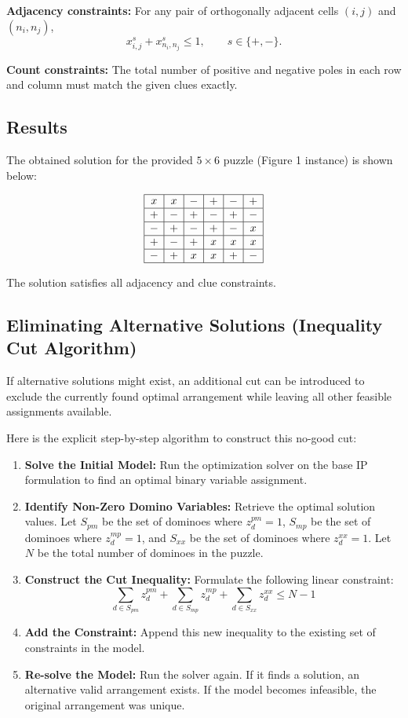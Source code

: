 \documentclass[11pt,a4paper]{article}
\begin{document}
\textbf{Adjacency constraints:} For any pair of orthogonally adjacent cells $(i,j)$ and $(n_i,n_j)$,
\[
x_{i,j}^{s}+x_{n_i,n_j}^{s} \leq 1, \qquad s \in \{+,-\}.
\]

\textbf{Count constraints:} The total number of positive and negative poles in each row and column must match the given clues exactly.

\subsection*{Results}

The obtained solution for the provided $5\times 6$ puzzle (Figure 1 instance) is shown below:

\[
\begin{array}{|c|c|c|c|c|c|}
\hline
x & x & - & + & - & + \\
\hline
+ & - & + & - & + & - \\
\hline
- & + & - & + & - & x \\
\hline
+ & - & + & x & x & x \\
\hline
- & + & x & x & + & - \\
\hline
\end{array}
\]

The solution satisfies all adjacency and clue constraints.

\subsection*{Eliminating Alternative Solutions (Inequality Cut Algorithm)}

If alternative solutions might exist, an additional cut can be introduced to exclude the currently found optimal arrangement while leaving all other feasible assignments available. 

Here is the explicit step-by-step algorithm to construct this no-good cut:
\begin{enumerate}
    \item \textbf{Solve the Initial Model:} Run the optimization solver on the base IP formulation to find an optimal binary variable assignment.
    \item \textbf{Identify Non-Zero Domino Variables:} Retrieve the optimal solution values. Let $S_{pm}$ be the set of dominoes where $z_d^{pm} = 1$, $S_{mp}$ be the set of dominoes where $z_d^{mp} = 1$, and $S_{xx}$ be the set of dominoes where $z_d^{xx} = 1$. Let $N$ be the total number of dominoes in the puzzle.
    \item \textbf{Construct the Cut Inequality:} Formulate the following linear constraint:
    \[
    \sum_{d \in S_{pm}} z_d^{pm} + \sum_{d \in S_{mp}} z_d^{mp} + \sum_{d \in S_{xx}} z_d^{xx} \leq N - 1
    \]
    \item \textbf{Add the Constraint:} Append this new inequality to the existing set of constraints in the model.
    \item \textbf{Re-solve the Model:} Run the solver again. If it finds a solution, an alternative valid arrangement exists. If the model becomes infeasible, the original arrangement was unique.
\end{enumerate}
\end{document}
